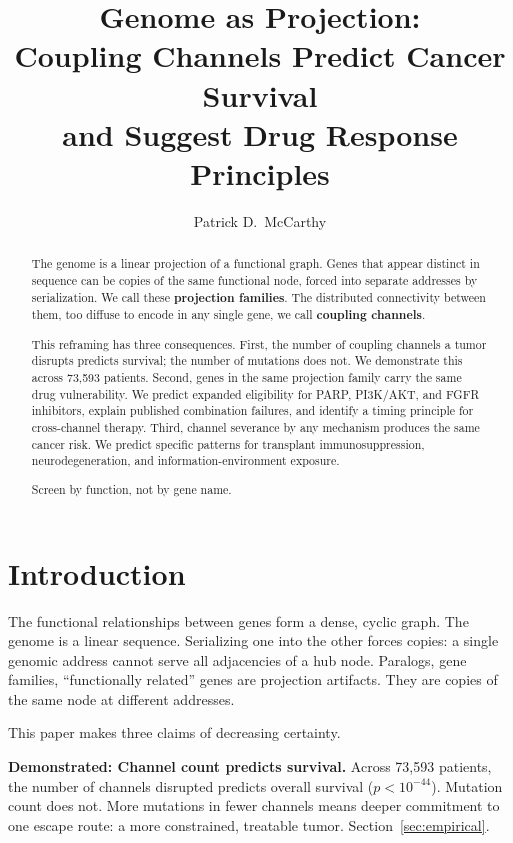 \documentclass[11pt]{article}
\title{Genome as Projection:\\Coupling Channels Predict Cancer Survival\\and Suggest Drug Response Principles}
\author{Patrick D.\ McCarthy}
\date{}
\begin{document}
\maketitle

\begin{abstract}
The genome is a linear projection of a functional graph. Genes that
appear distinct in sequence can be copies of the same functional
node, forced into separate addresses by serialization. We call these
\textbf{projection families}. The distributed connectivity between
them, too diffuse to encode in any single gene, we call
\textbf{coupling channels}.

This reframing has three consequences. First, the number of coupling
channels a tumor disrupts predicts survival; the number of mutations
does not. We demonstrate this across 73{,}593 patients. Second,
genes in the same projection family carry the same drug
vulnerability. We predict expanded eligibility for PARP, PI3K/AKT,
and FGFR inhibitors, explain published combination failures, and
identify a timing principle for cross-channel therapy. Third,
channel severance by any mechanism produces the same cancer risk.
We predict specific patterns for transplant immunosuppression,
neurodegeneration, and information-environment exposure.

Screen by function, not by gene name.
\end{abstract}

\section{Introduction}
\label{sec:intro}

The functional relationships between genes form a dense, cyclic
graph. The genome is a linear sequence. Serializing one into the
other forces copies: a single genomic address cannot serve all
adjacencies of a hub node. Paralogs, gene families, ``functionally
related'' genes are projection artifacts. They are copies of the
same node at different addresses.

This paper makes three claims of decreasing certainty.

\textbf{Demonstrated: Channel count predicts survival.} Across
73{,}593 patients, the number of channels disrupted predicts overall
survival ($p < 10^{-44}$). Mutation count does not. More mutations
in fewer channels means deeper commitment to one escape route: a
more constrained, treatable tumor. Section~\ref{sec:empirical}.
\end{document}

